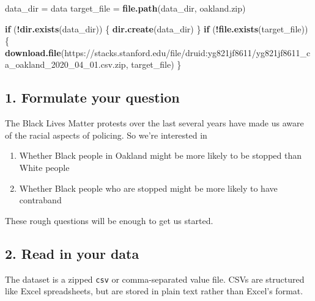 \documentclass[
]{article}
\newenvironment{Shaded}{\begin{snugshade}}{\end{snugshade}}
\newcommand{\ControlFlowTok}[1]{\textcolor[rgb]{0.13,0.29,0.53}{\textbf{#1}}}
\newcommand{\KeywordTok}[1]{\textcolor[rgb]{0.13,0.29,0.53}{\textbf{#1}}}
\newcommand{\NormalTok}[1]{#1}
\newcommand{\OperatorTok}[1]{\textcolor[rgb]{0.81,0.36,0.00}{\textbf{#1}}}
\newcommand{\StringTok}[1]{\textcolor[rgb]{0.31,0.60,0.02}{#1}}
\providecommand{\tightlist}{%
  \setlength{\itemsep}{0pt}\setlength{\parskip}{0pt}}
\begin{document}
\begin{Shaded}
\begin{Highlighting}[]
\NormalTok{data\_dir =}\StringTok{ \textquotesingle{}data\textquotesingle{}}
\NormalTok{target\_file =}\StringTok{ }\KeywordTok{file.path}\NormalTok{(data\_dir, }\StringTok{\textquotesingle{}oakland.zip\textquotesingle{}}\NormalTok{)}

\ControlFlowTok{if}\NormalTok{ (}\OperatorTok{!}\KeywordTok{dir.exists}\NormalTok{(data\_dir)) \{}
    \KeywordTok{dir.create}\NormalTok{(data\_dir)}
\NormalTok{\}}
\ControlFlowTok{if}\NormalTok{ (}\OperatorTok{!}\KeywordTok{file.exists}\NormalTok{(target\_file)) \{}
    \KeywordTok{download.file}\NormalTok{(}\StringTok{\textquotesingle{}https://stacks.stanford.edu/file/druid:yg821jf8611/yg821jf8611\_ca\_oakland\_2020\_04\_01.csv.zip\textquotesingle{}}\NormalTok{, }
\NormalTok{                  target\_file)}
\NormalTok{\}}
\end{Highlighting}
\end{Shaded}

\hypertarget{formulate-your-question}{%
\subsection{1. Formulate your question}\label{formulate-your-question}}

The Black Lives Matter protests over the last several years have made us aware of the racial aspects of policing. So we're interested in

\begin{enumerate}
\def\labelenumi{\arabic{enumi}.}
\tightlist
\item
  Whether Black people in Oakland might be more likely to be stopped than White people
\item
  Whether Black people who are stopped might be more likely to have contraband
\end{enumerate}

These rough questions will be enough to get us started.

\hypertarget{read-in-your-data}{%
\subsection{2. Read in your data}\label{read-in-your-data}}

The dataset is a zipped \texttt{csv} or comma-separated value file. CSVs are structured like Excel spreadsheets, but are stored in plain text rather than Excel's format.
\end{document}
